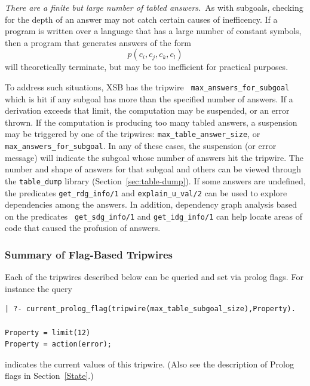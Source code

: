 \item {\em There are a finite but large number of tabled answers.}\ As
  with subgoals, checking for the depth of an answer may not catch
  certain causes of inefficency. If a program is written over a
  language that has a large number of constant symbols, then a program
  that generates answers of the form
\[
   p(c_i,c_j,c_k,c_l)
\]
  will theoretically terminate, but may be too inefficient for
  practical purposes.  

  To address such situations, XSB has the tripwire {\tt
    max\_answers\_for\_subgoal} which is hit if any subgoal has more
  than the specified number of answers.  If a derivation exceeds that
  limit, the computation may be suspended, or an error thrown.
%
  If the computation is producing too
 many tabled answers, a suspension may be triggered by one of the
 tripwires: {\tt max\_table\_answer\_size}, or {\tt
 max\_answers\_for\_subgoal}.  In any of these cases, the suspension
 (or error message) will indicate the subgoal whose number of answers
 hit the tripwire.  The number and shape of answers for that subgoal
 and others can be viewed through the {\tt table\_dump} library
 (Section~\ref{sec:table-dump}).  If some answers are undefined, the
 predicates {\tt get\_rdg\_info/1} and {\tt explain\_u\_val/2} can be
 used to explore dependencies among the answers.  In addition,
 dependency graph analysis based on the predicates {\tt
 get\_sdg\_info/1} and {\tt get\_idg\_info/1} can help locate areas of
 code that caused the profusion of answers.

 \ei

\subsubsection{Summary of Flag-Based Tripwires}
%
Each of the tripwires described below can be queried and set via
 prolog flags.  For instance the query

\begin{verbatim}
| ?- current_prolog_flag(tripwire(max_table_subgoal_size),Property).

Property = limit(12)
Property = action(error);
\end{verbatim}
indicates the current values of this tripwire.  (Also see the
 description of Prolog flags in Section~\ref{State}.)

